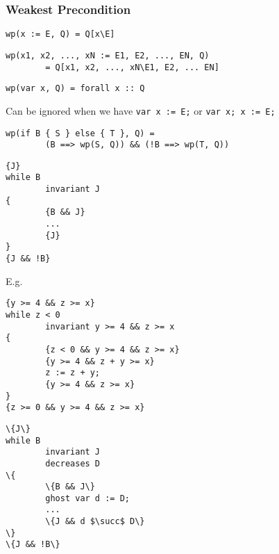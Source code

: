 \subsubsection{Weakest Precondition}

\begin{verbatim}
wp(x := E, Q) = Q[x\E]
\end{verbatim}

\begin{verbatim}
wp(x1, x2, ..., xN := E1, E2, ..., EN, Q)
        = Q[x1, x2, ..., xN\E1, E2, ... EN]
\end{verbatim}

\begin{verbatim}
wp(var x, Q) = forall x :: Q
\end{verbatim}
Can be ignored when we have \verb!var x := E;! or \verb!var x; x := E;!

\begin{verbatim}
wp(if B { S } else { T }, Q) =
        (B ==> wp(S, Q)) && (!B ==> wp(T, Q))
\end{verbatim}

\begin{verbatim}
{J}
while B
        invariant J
{
        {B && J}
        ... 
        {J}
}
{J && !B}
\end{verbatim}
E.g.
\begin{verbatim}
{y >= 4 && z >= x}
while z < 0
        invariant y >= 4 && z >= x
{
        {z < 0 && y >= 4 && z >= x}
        {y >= 4 && z + y >= x}
        z := z + y;
        {y >= 4 && z >= x}
}
{z >= 0 && y >= 4 && z >= x}
\end{verbatim}

\begin{Verbatim}[commandchars=\\\{\}, codes={\catcode`$=3\catcode`^=7}]
\{J\}
while B
        invariant J
        decreases D
\{
        \{B && J\}
        ghost var d := D;
        ... 
        \{J && d $\succ$ D\}
\}
\{J && !B\}
\end{Verbatim}

